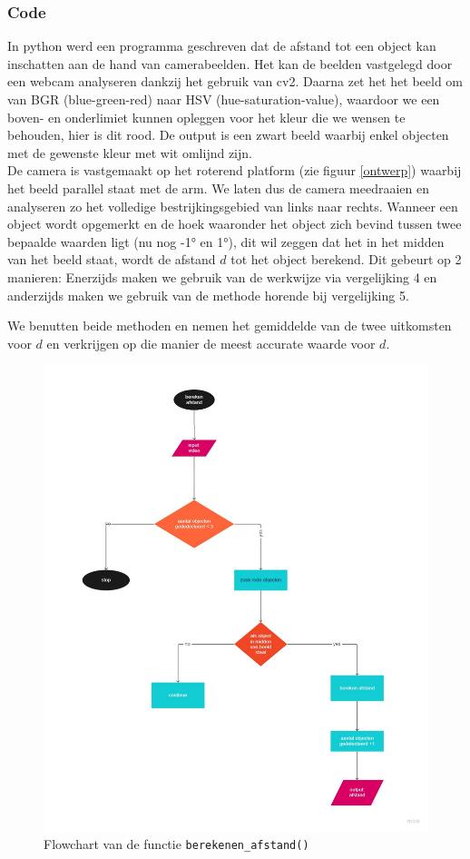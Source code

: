 \documentclass[kulak]{kulakarticle} %
\begin{document}
		\subsubsection{Code}
		
			In python werd een programma geschreven dat de afstand tot een object kan inschatten aan de hand van camerabeelden. Het kan de beelden vastgelegd door een webcam analyseren dankzij het gebruik van cv2. Daarna zet het het beeld om van BGR (blue-green-red) naar HSV (hue-saturation-value), waardoor we een boven- en onderlimiet kunnen opleggen voor het kleur die we wensen te behouden, hier is dit rood. De output is een zwart beeld waarbij enkel objecten met de gewenste kleur met wit omlijnd zijn.\\
			De camera is vastgemaakt op het roterend platform (zie figuur \ref{ontwerp}) waarbij het beeld parallel staat met de arm. We laten dus de camera meedraaien en analyseren zo het volledige bestrijkingsgebied van links naar rechts. Wanneer een object wordt opgemerkt en de hoek waaronder het object zich bevind tussen twee bepaalde waarden ligt (nu nog -1° en 1°), dit wil zeggen dat het in het midden van het beeld staat, wordt de afstand \(d\) tot het object berekend. Dit gebeurt op 2 manieren: Enerzijds maken we gebruik van de werkwijze via vergelijking 4 en anderzijds maken we gebruik van de methode horende bij vergelijking 5.
				
			We benutten beide methoden en nemen het gemiddelde van de twee uitkomsten voor \(d\) en verkrijgen op die manier de meest accurate waarde voor \(d\).


				\begin{figure} [!h]
					\centering
					\includegraphics[width = 0.8 \textwidth]{flowchart afstand berekenen.pdf}
				\cprotect\caption{Flowchart van de functie \verb*|berekenen_afstand()|}
				\end{figure}
 
\end{document}
